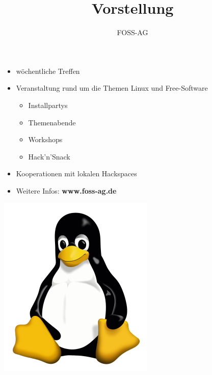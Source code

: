 \documentclass{beamer}
\author{FOSS-AG}
\title{Vorstellung}
\begin{document}
	
	\begin{frame}
		\vspace{0.2cm}
		\begin{minipage}{0.56\linewidth}
			\begin{itemize}
				\item wöchentliche Treffen
				\item Veranstaltung rund um die Themen Linux und Free-Software
				\begin{itemize}
					\item Installpartys
					\item Themenabende
					\item Workshops
					\item Hack'n'Snack
				\end{itemize}
				\item Kooperationen mit lokalen Hackspaces
				\item Weitere Infos: \textbf{www.foss-ag.de}
			\end{itemize}
		\end{minipage}
	
		\hspace*{0.8\linewidth}
		\begin{minipage}{0.35\linewidth}
			\includegraphics[scale=0.2]{tux}
		\end{minipage}
	\end{frame}
\end{document}
